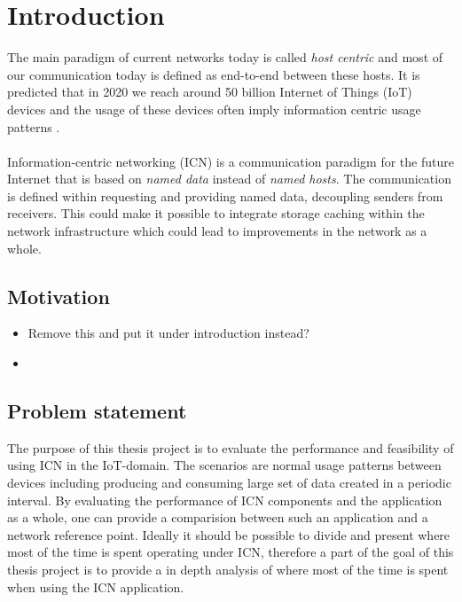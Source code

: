 \section{Introduction}
The main paradigm of current networks today is called  \textit{host centric} and most of our communication today is defined as end-to-end between these hosts. It is predicted that in 2020 we reach around 50 billion Internet of Things (IoT) devices \cite{alanCarlton} and the usage of these devices often imply information centric usage patterns \cite{Ahlgren2012}.
\\\\
Information-centric networking (ICN) is a communication paradigm for the future Internet that is based on \textit{named data} instead of \textit{named hosts}. The communication is defined within requesting and providing named data, decoupling senders from receivers. This could make it possible to integrate storage caching within the network infrastructure\cite{Ahlgren2012} which could lead to improvements in the network as a whole.


\subsection{Motivation}
\begin{itemize}
	\item Remove this and put it under introduction instead?
	\item 
\end{itemize}

\subsection{Problem statement}

The purpose of this thesis project is to evaluate the performance and feasibility of using ICN in the IoT-domain. The scenarios are normal usage patterns between devices including producing and consuming large set of data created in a periodic interval. By evaluating the performance of ICN components and the application as a whole, one can provide a comparision between such an application and a network reference point. Ideally it should be possible to divide and present where most of the time is spent operating under ICN, therefore a part of the goal of this thesis project is to provide a in depth analysis of where most of the time is spent when using the ICN application. 

